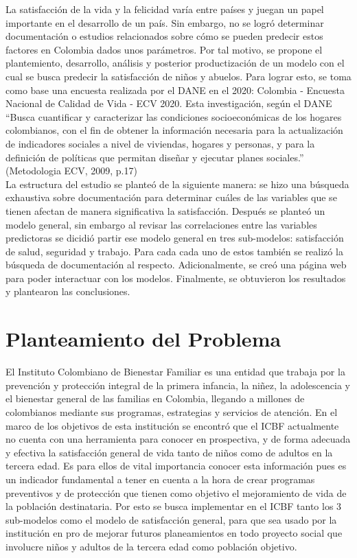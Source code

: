 \documentclass[
]{article}
\begin{document}
La satisfacción de la vida y la felicidad varía entre países \cite{b7} y
juegan un papel importante en el desarrollo de un país. Sin embargo, no
se logró determinar documentación o estudios relacionados sobre cómo se
pueden predecir estos factores en Colombia dados unos parámetros. Por
tal motivo, se propone el plantemiento, desarrollo, análisis y posterior
productización de un modelo con el cual se busca predecir la
satisfacción de niños y abuelos. Para lograr esto, se toma como base una
encuesta realizada por el DANE en el 2020: Colombia - Encuesta Nacional
de Calidad de Vida - ECV 2020. Esta investigación, según el DANE ``Busca
cuantificar y caracterizar las condiciones socioeconómicas de los
hogares colombianos, con el fin de obtener la información necesaria para
la actualización de indicadores sociales a nivel de viviendas, hogares y
personas, y para la definición de políticas que permitan diseñar y
ejecutar planes sociales.'' (Metodologia ECV, 2009, p.17)\\
La estructura del estudio se planteó de la siguiente manera: se hizo una
búsqueda exhaustiva sobre documentación para determinar cuáles de las
variables que se tienen afectan de manera significativa la satisfacción.
Después se planteó un modelo general, sin embargo al revisar las
correlaciones entre las variables predictoras se dicidió partir ese
modelo general en tres sub-modelos: satisfacción de salud, seguridad y
trabajo. Para cada cada uno de estos también se realizó la búsqueda de
documentación al respecto. Adicionalmente, se creó una página web para
poder interactuar con los modelos. Finalmente, se obtuvieron los
resultados y plantearon las conclusiones.

\hypertarget{planteamiento-del-problema}{%
\section{Planteamiento del Problema}\label{planteamiento-del-problema}}

El Instituto Colombiano de Bienestar Familiar es una entidad que trabaja
por la prevención y protección integral de la primera infancia, la
niñez, la adolescencia y el bienestar general de las familias en
Colombia, llegando a millones de colombianos mediante sus programas,
estrategias y servicios de atención. En el marco de los objetivos de
esta institución se encontró que el ICBF actualmente no cuenta con una
herramienta para conocer en prospectiva, y de forma adecuada y efectiva
la satisfacción general de vida tanto de niños como de adultos en la
tercera edad. Es para ellos de vital importancia conocer esta
información pues es un indicador fundamental a tener en cuenta a la hora
de crear programas preventivos y de protección que tienen como objetivo
el mejoramiento de vida de la población destinataria. Por esto se busca
implementar en el ICBF tanto los 3 sub-modelos como el modelo de
satisfacción general, para que sea usado por la institución en pro de
mejorar futuros planeamientos en todo proyecto social que involucre
niños y adultos de la tercera edad como población objetivo.
\end{document}
